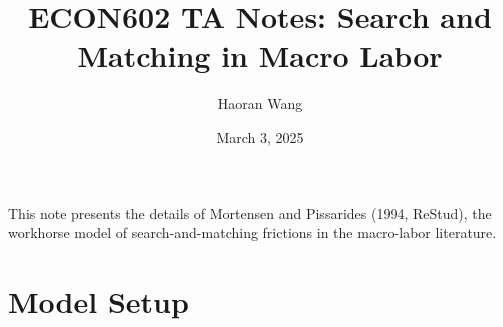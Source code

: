 \documentclass[12pt]{article}
\title{ECON602 TA Notes: Search and Matching in Macro Labor}
\author{Haoran Wang}
\date{March 3, 2025}
\begin{document}
	\maketitle
	
	\tableofcontents 
	
		This note presents the details of Mortensen and Pissarides (1994, ReStud), the workhorse model of search-and-matching frictions in the macro-labor literature. 
%	
%	
	
\section{Model Setup}
	
\end{document}
